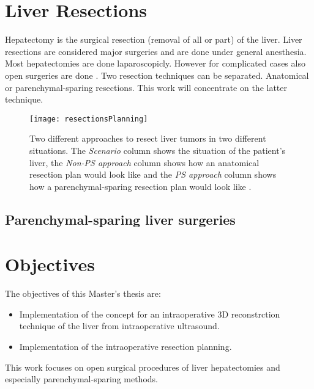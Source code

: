 \section{Liver Resections} 
Hepatectomy is the surgical resection (removal of all or part) of the liver.
Liver resections are considered major surgeries and are done under general
anesthesia. Most hepatectomies are done laparoscopicly. However for complicated
cases also open surgeries are done \cite{cherqui2000laparoscopic}. Two
resection techniques can be separated. Anatomical or parenchymal-sparing
resections. This work will concentrate on the latter technique.
\begin{figure}[H]
  \centering
 \texttt{[image: resectionsPlanning]}
  \caption{Two different approaches to resect liver tumors in two different
    situations. The \textit{Scenario} column shows the situation of the
    patient's liver, the \textit{Non-PS approach} column shows how an anatomical
  resection plan would look like and the \textit{PS approach} column shows how a
parenchymal-sparing resection plan would look like \cite{alvarez2016parenchymal}.}
  \label{fig:resectionsPlanning}
\end{figure}

\subsection{Parenchymal-sparing liver surgeries}
\cite{alvarez2016parenchymal}
\section{Objectives} 
The objectives of this Master's thesis are:
\begin{itemize}
  \item Implementation of the concept for an intraoperative 3D reconstrction
  technique of the liver from intraoperative ultrasound. 
  \item Implementation of the intraoperative resection planning.
\end{itemize}
This work focuses on open surgical procedures of liver hepatectomies and
especially parenchymal-sparing methods.



\endinput
